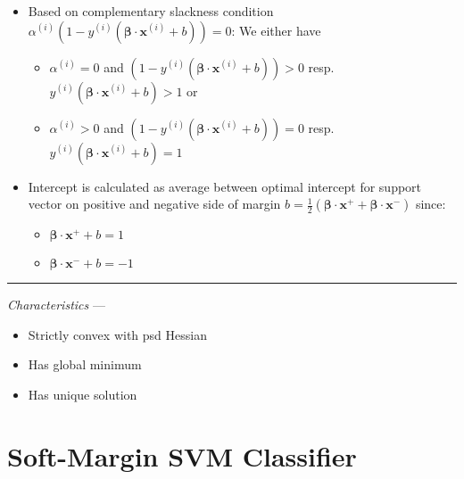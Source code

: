 \begin{itemize}
    \begin{itemize}
        \item Based on complementary slackness condition $\alpha^{(i)} (1 - y^{(i)} (\boldsymbol{\beta} \cdot \boldsymbol{x}^{(i)} + b)) = 0$: We either have 
        \begin{itemize}
            \item $\alpha^{(i)} = 0$ and $ (1 - y^{(i)} (\boldsymbol{\beta} \cdot \boldsymbol{x}^{(i)} + b)) > 0$ resp. $ y^{(i)} (\boldsymbol{\beta} \cdot \boldsymbol{x}^{(i)} + b) > 1$ or
            \item $\alpha^{(i)} > 0$ and $ (1 - y^{(i)} (\boldsymbol{\beta} \cdot \boldsymbol{x}^{(i)} + b)) = 0$ resp. $ y^{(i)} (\boldsymbol{\beta} \cdot \boldsymbol{x}^{(i)} + b) = 1$ 
        \end{itemize}
        \item Intercept is calculated as average between optimal intercept for support vector on positive and negative side of margin $b = \frac{1}{2} (\boldsymbol{\beta} \cdot \boldsymbol{x}^+ + \boldsymbol{\beta} \cdot \boldsymbol{x}^-)$ since:
        \begin{itemize}
            \item $\boldsymbol{\beta} \cdot \boldsymbol{x}^+ + b = 1$
            \item $\boldsymbol{\beta} \cdot \boldsymbol{x}^- + b = -1$
        \end{itemize}
    \end{itemize}
\end{itemize}

{\color{lightgray}\hrule height 0.001mm}

\emph{Characteristics} --- 
\begin{itemize}
    \item Strictly convex with psd Hessian
    \item Has global minimum
    \item Has unique solution
\end{itemize}

\section{Soft-Margin SVM Classifier}
